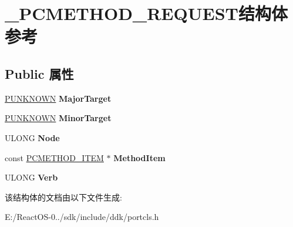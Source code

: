 \hypertarget{struct___p_c_m_e_t_h_o_d___r_e_q_u_e_s_t}{}\section{\+\_\+\+P\+C\+M\+E\+T\+H\+O\+D\+\_\+\+R\+E\+Q\+U\+E\+S\+T结构体 参考}
\label{struct___p_c_m_e_t_h_o_d___r_e_q_u_e_s_t}
\subsection*{Public 属性}
\begin{DoxyCompactItemize}
\item 
\mbox{\label{struct___p_c_m_e_t_h_o_d___r_e_q_u_e_s_t_a5e494269d8c3a797518321cc700ca872}} 
\hyperlink{interface_i_unknown}{P\+U\+N\+K\+N\+O\+WN} {\bfseries Major\+Target}
\item 
\mbox{\label{struct___p_c_m_e_t_h_o_d___r_e_q_u_e_s_t_a7a41ecdb19658b8d94da28bc2df15820}} 
\hyperlink{interface_i_unknown}{P\+U\+N\+K\+N\+O\+WN} {\bfseries Minor\+Target}
\item 
\mbox{\label{struct___p_c_m_e_t_h_o_d___r_e_q_u_e_s_t_ae5562c96d325d666c3deac9aa36949f9}} 
U\+L\+O\+NG {\bfseries Node}
\item 
\mbox{\label{struct___p_c_m_e_t_h_o_d___r_e_q_u_e_s_t_acdb1fe47107c201344685813bdeeebcd}} 
const \hyperlink{struct___p_c_m_e_t_h_o_d___i_t_e_m}{P\+C\+M\+E\+T\+H\+O\+D\+\_\+\+I\+T\+EM} $\ast$ {\bfseries Method\+Item}
\item 
\mbox{\label{struct___p_c_m_e_t_h_o_d___r_e_q_u_e_s_t_a7bb22ba13324268ce1fd39200c430257}} 
U\+L\+O\+NG {\bfseries Verb}
\end{DoxyCompactItemize}


该结构体的文档由以下文件生成\+:\begin{DoxyCompactItemize}
\item 
E\+:/\+React\+O\+S-\/0../sdk/include/ddk/portcls.\+h\end{DoxyCompactItemize}
